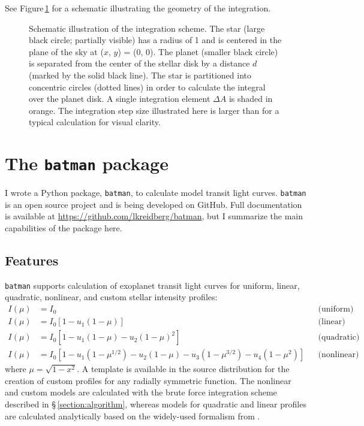 \documentclass[12pt,preprint]{aastex}
\newcommand*{\blue}{\textcolor{blue}}
\begin{document}
See Figure\,\ref{fig:integration} for a schematic illustrating the geometry of the integration. 

\begin{figure}
\caption{Schematic illustration of the integration scheme. The star (large black circle; partially visible) has a radius of 1 and is centered in the plane of the sky at ($x$, $y$) = (0, 0). The planet (smaller black circle) is separated from the center of the stellar disk by a distance $d$ (marked by the solid black line).  The star is partitioned into concentric circles (dotted lines) in order to calculate the integral over the planet disk.  A single integration element $\Delta A$ is shaded in orange. The integration step size illustrated here is larger than for a typical calculation for visual clarity.}
\label{fig:integration}
\end{figure}

\section{The \texttt{batman} package}
I wrote a Python package, \texttt{batman}, to calculate model transit light curves.  \texttt{batman} is an open source project and is being developed on GitHub.  Full documentation is available at \blue{\url{https://github.com/lkreidberg/batman}}, but I summarize the main capabilities of the package here.

\subsection{Features}
\texttt{batman} supports calculation of exoplanet transit light curves for uniform, linear, quadratic, nonlinear, and custom stellar intensity profiles:
\begin{align}
  I(\mu) &= I_0                                                                         & &\text{(uniform)}             \\
  I(\mu) &= I_0[1 - u_1(1-\mu)]                                                         & &\text{(linear)}              \\
  I(\mu) &= I_0[1 - u_1(1 - \mu) - u_2(1-\mu)^2]                                        & &\text{(quadratic)}           \\
  I(\mu) &= I_0[1 - u_1(1-\mu^{1/2}) - u_2(1- \mu) - u_3(1-\mu^{3/2}) - u_4(1-\mu^2)]   & &\text{(nonlinear)}
\end{align}
where $\mu = \sqrt{1-x^2}$.  A template is available in the source distribution for the creation of custom profiles for any radially symmetric function.  The nonlinear and custom models are calculated with the brute force integration scheme described in \S\,\ref{section:algorithm}, whereas models for quadratic and linear profiles are calculated analytically based on the widely-used formalism from \cite{mandel02}.  
\end{document}
